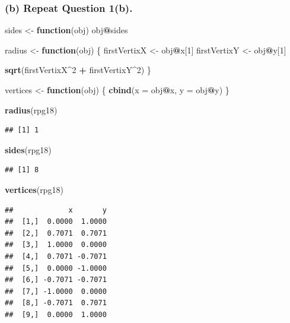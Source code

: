 \documentclass[]{article}
\newenvironment{Shaded}{\begin{snugshade}}{\end{snugshade}}
\newcommand{\KeywordTok}[1]{\textcolor[rgb]{0.13,0.29,0.53}{\textbf{#1}}}
\newcommand{\DataTypeTok}[1]{\textcolor[rgb]{0.13,0.29,0.53}{#1}}
\newcommand{\DecValTok}[1]{\textcolor[rgb]{0.00,0.00,0.81}{#1}}
\newcommand{\StringTok}[1]{\textcolor[rgb]{0.31,0.60,0.02}{#1}}
\newcommand{\ControlFlowTok}[1]{\textcolor[rgb]{0.13,0.29,0.53}{\textbf{#1}}}
\newcommand{\OperatorTok}[1]{\textcolor[rgb]{0.81,0.36,0.00}{\textbf{#1}}}
\newcommand{\NormalTok}[1]{#1}
\begin{document}
\subsubsection{(b) Repeat Question 1(b).}\label{b-repeat-question-1b.}

\begin{Shaded}
\begin{Highlighting}[]
\NormalTok{sides <-}\StringTok{ }\ControlFlowTok{function}\NormalTok{(obj) obj}\OperatorTok{@}\NormalTok{sides}

\NormalTok{radius <-}\StringTok{ }\ControlFlowTok{function}\NormalTok{(obj) \{}
\NormalTok{  firstVertixX <-}\StringTok{ }\NormalTok{obj}\OperatorTok{@}\NormalTok{x[}\DecValTok{1}\NormalTok{]}
\NormalTok{  firstVertixY <-}\StringTok{ }\NormalTok{obj}\OperatorTok{@}\NormalTok{y[}\DecValTok{1}\NormalTok{]}
  
  \KeywordTok{sqrt}\NormalTok{(firstVertixX}\OperatorTok{^}\DecValTok{2} \OperatorTok{+}\StringTok{ }\NormalTok{firstVertixY}\OperatorTok{^}\DecValTok{2}\NormalTok{)}
\NormalTok{\}}

\NormalTok{vertices <-}\StringTok{ }\ControlFlowTok{function}\NormalTok{(obj) \{}
  \KeywordTok{cbind}\NormalTok{(}\DataTypeTok{x =}\NormalTok{ obj}\OperatorTok{@}\NormalTok{x, }\DataTypeTok{y =}\NormalTok{ obj}\OperatorTok{@}\NormalTok{y)}
\NormalTok{\}}

\KeywordTok{radius}\NormalTok{(rpg18)}
\end{Highlighting}
\end{Shaded}

\begin{verbatim}
## [1] 1
\end{verbatim}

\begin{Shaded}
\begin{Highlighting}[]
\KeywordTok{sides}\NormalTok{(rpg18)}
\end{Highlighting}
\end{Shaded}

\begin{verbatim}
## [1] 8
\end{verbatim}

\begin{Shaded}
\begin{Highlighting}[]
\KeywordTok{vertices}\NormalTok{(rpg18)}
\end{Highlighting}
\end{Shaded}

\begin{verbatim}
##             x       y
##  [1,]  0.0000  1.0000
##  [2,]  0.7071  0.7071
##  [3,]  1.0000  0.0000
##  [4,]  0.7071 -0.7071
##  [5,]  0.0000 -1.0000
##  [6,] -0.7071 -0.7071
##  [7,] -1.0000  0.0000
##  [8,] -0.7071  0.7071
##  [9,]  0.0000  1.0000
\end{verbatim}
\end{document}
